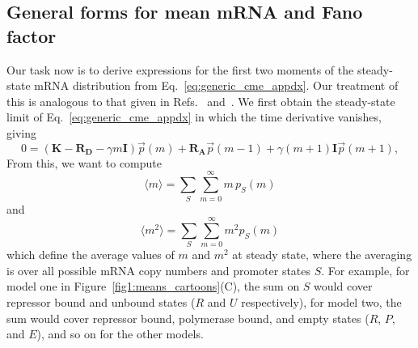 \subsection{General forms for mean mRNA and Fano factor}
Our task now is to derive expressions for the first two moments of the
steady-state mRNA distribution from Eq.~\ref{eq:generic_cme_appdx}. Our
treatment of this is analogous to that given in Refs.~\cite{Sanchez2011}
and~\cite{Razo-Mejia2020}. We first obtain the steady-state limit of
Eq.~\ref{eq:generic_cme_appdx} in which the time derivative vanishes, giving
\begin{equation}
0 =
\left( \mathbf{K} - \mathbf{R_D} - \gamma m \mathbf{I} \right) \vec{p}(m)
                + \mathbf{R_A} \vec{p}(m-1) +
                \gamma (m+1) \mathbf{I} \vec{p}(m+1),
\label{eq:generic_cme_ss}
\end{equation}
From this, we want to compute
\begin{equation}
\langle{m}\rangle = \sum_S \sum_{m=0}^\infty m \, p_S(m)
\end{equation}
and
\begin{equation}
\langle{m^2}\rangle = \sum_S \sum_{m=0}^\infty m^2 p_S(m)
\end{equation}
which define the average values of $m$ and $m^2$ at steady state, where the
averaging is over all possible mRNA copy numbers and promoter states $S$. For
example, for model one in Figure~\ref{fig1:means_cartoons}(C), the sum on $S$
would cover repressor bound and unbound states ($R$ and $U$ respectively), for
model two, the sum would cover repressor bound, polymerase bound, and empty
states ($R$, $P$, and $E$), and so on for the other models.

